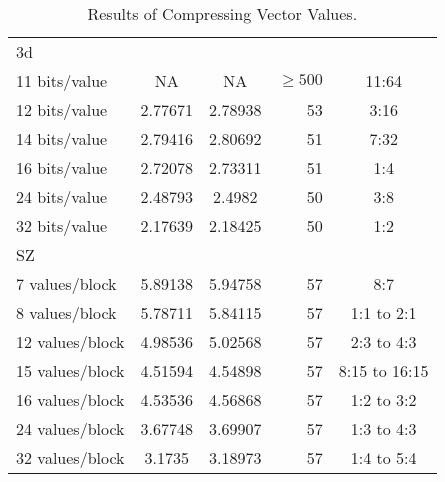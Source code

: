\begin{table}
\begin{tabular}{l|S[table-format=2.6]|S[table-format=2.6]|r|c}
		\hspace{3mm} 3d & & & & \\
			\hspace{6mm} 11 bits/value & NA & NA & \(\geq 500\) & 11:64 \\
			\hspace{6mm} 12 bits/value & 2.77671 & 2.78938 & 53 & 3:16 \\
			\hspace{6mm} 14 bits/value & 2.79416 & 2.80692 & 51 & 7:32\\
			\hspace{6mm} 16 bits/value & 2.72078 & 2.73311 & 51 & 1:4 \\
			\hspace{6mm} 24 bits/value & 2.48793 & 2.4982 & 50 & 3:8 \\ 
			\hspace{6mm} 32 bits/value & 2.17639 & 2.18425 & 50 & 1:2 \\
		SZ & & & & \\
		\hspace{3mm} 7 values/block & 5.89138 & 5.94758 & 57 & 8:7 \\
		\hspace{3mm} 8 values/block & 5.78711 & 5.84115 & 57 & 1:1 to 2:1 \\
		\hspace{3mm} 12 values/block & 4.98536 & 5.02568 & 57 & 2:3 to 4:3 \\
		\hspace{3mm} 15 values/block & 4.51594 & 4.54898 & 57 & 8:15 to 16:15 \\
		\hspace{3mm} 16 values/block & 4.53536 & 4.56868 & 57 & 1:2 to 3:2 \\
		\hspace{3mm} 24 values/block & 3.67748 & 3.69907 & 57 & 1:3 to 4:3\\
		\hspace{3mm} 32 values/block & 3.1735 & 3.18973 & 57 & 1:4 to 5:4\\
	\end{tabular}
	\caption{Results of Compressing Vector Values.}
	\label{tab:results-vec}
\end{table}
